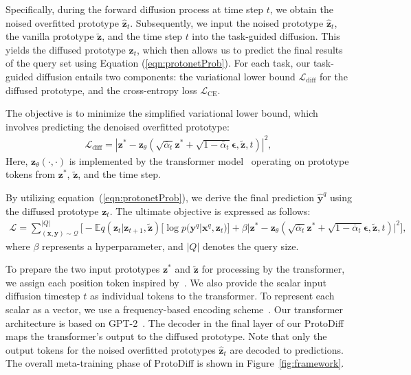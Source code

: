 Specifically, during the forward diffusion process at time step $t$, we obtain the noised overfitted prototype $\hat{\mathbf{z}}_t$. Subsequently, we input the noised prototype $\hat{\mathbf{z}}_t$, the vanilla prototype $\tilde{\mathbf{z}}$, and the time step $t$ into the task-guided diffusion. This yields the diffused prototype $\mathbf{z}_t$, which then allows us to predict the final results of the query set using Equation (\ref{eqn:protonetProb}). For each task, our task-guided diffusion entails two components: the variational lower bound $\mathcal{L}_{\mathrm{diff}}$ for the diffused prototype, and the cross-entropy loss $\mathcal{L}_{\mathrm{CE}}$.

The objective is to minimize the simplified variational lower bound, which involves predicting the denoised overfitted prototype:
\begin{align}
\label{eq:vlb}
\mathcal{L}_{\mathrm{diff}} = |\mathbf{z}^* - \mathbf{z}_\theta(\sqrt{\bar{\alpha}_t}\mathbf{z}^* +\sqrt{1-\bar{\alpha}_t}\boldsymbol{\epsilon}, \tilde{\mathbf{z}}, t)|^2,
\end{align}
Here, $\mathbf{z}_\theta(\cdot, \cdot)$ is implemented by the transformer model~\cite{vaswani2017attention} operating on prototype tokens from $\mathbf{z}^*$, $\tilde{\mathbf{z}}$, and the time step.

By utilizing equation~(\ref{eqn:protonetProb}), we derive the final prediction $\hat{\mathbf{y}}^q$ using the diffused prototype $\mathbf{z}_t$. The ultimate objective is expressed as follows:
 \begin{align}
\label{eq:final_loss}
\mathcal{L} = \sum^{|Q|}_{{(\mathbf{x}, \mathbf{y}) \sim \mathcal{Q}}} \Big[ - \mathbb{E}{q(\mathbf{z}_t|\mathbf{z}_{t+1}, \tilde{\mathbf{z}})}\big[\log p(\mathbf{y}^q|\mathbf{x}^q,\mathbf{z}_t)\big] + \beta |\mathbf{z}^* - \mathbf{z}_\theta(\sqrt{\bar{\alpha}_t}\mathbf{z}^* +\sqrt{1-\bar{\alpha}_t}\boldsymbol{\epsilon}, \tilde{\mathbf{z}}, t)|^2\Big],
\end{align}   
where $\beta$ represents a hyperparameter, and $|Q|$ denotes the query size.

To prepare the two input prototypes $\mathbf{z}^*$ and $\tilde{\mathbf{z}}$ for processing by the transformer, we assign each position token inspired by~\cite{dosovitskiy2020image}. We also provide the scalar input diffusion timestep $t$ as individual tokens to the transformer. To represent each scalar as a vector, we use a frequency-based encoding scheme~\cite{mildenhall2021nerf}. Our transformer architecture is based on GPT-2~\cite{radford2019language}. The decoder in the final layer of our ProtoDiff maps the transformer's output to the diffused prototype.  Note that only the output tokens for the noised overfitted prototypes $\hat{\mathbf{z}}_t$ are decoded to predictions. The overall meta-training phase of ProtoDiff is shown in Figure~\ref{fig:framework}. 



